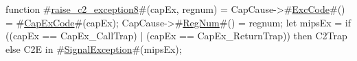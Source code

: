 function #\hyperref[zraisezyctwozyexceptioneight]{raise\_c2\_exception8}#(capEx, regnum) =
  {
    CapCause->#\hyperref[zExcCode]{ExcCode}#() = #\hyperref[zCapExCode]{CapExCode}#(capEx);
    CapCause->#\hyperref[zRegNum]{RegNum}#()  = regnum;
    let mipsEx = 
      if ((capEx == CapEx_CallTrap) | (capEx == CapEx_ReturnTrap)) 
      then C2Trap else C2E in
    #\hyperref[zSignalException]{SignalException}#(mipsEx);
  }
